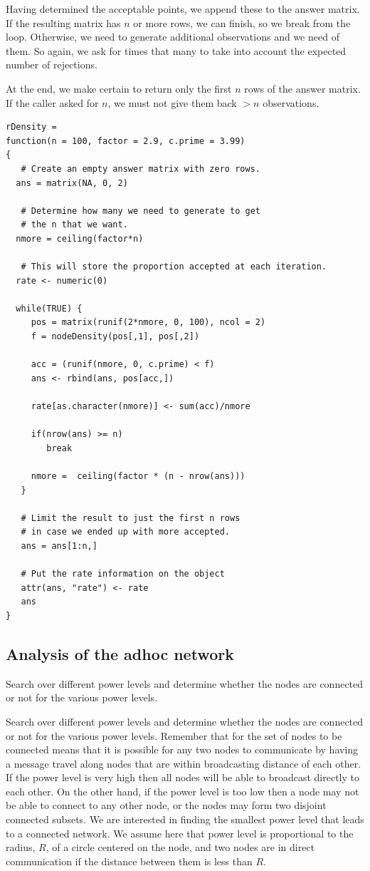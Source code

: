 Having determined the acceptable points, we append these to the answer
matrix. If the resulting matrix has $n$ or more rows, we can finish,
so we break from the loop.  Otherwise, we need to generate additional
observations and we need  of them.  So
again, we ask for  times that many to take into account
the expected number of rejections.

At the end, we make certain to return only the first $n$ rows of the
answer matrix. If the caller asked for $n$, we must not give them back
$> n$ observations.

{\footnotesize{
\begin{verbatim}
rDensity =
function(n = 100, factor = 2.9, c.prime = 3.99)
{
   # Create an empty answer matrix with zero rows.
  ans = matrix(NA, 0, 2)

   # Determine how many we need to generate to get
   # the n that we want. 
  nmore = ceiling(factor*n)

   # This will store the proportion accepted at each iteration.
  rate <- numeric(0)
  
  while(TRUE) {
     pos = matrix(runif(2*nmore, 0, 100), ncol = 2)
     f = nodeDensity(pos[,1], pos[,2])
     
     acc = (runif(nmore, 0, c.prime) < f)
     ans <- rbind(ans, pos[acc,])

     rate[as.character(nmore)] <- sum(acc)/nmore
     
     if(nrow(ans) >= n)
        break

     nmore =  ceiling(factor * (n - nrow(ans)))
   }

   # Limit the result to just the first n rows
   # in case we ended up with more accepted.
   ans = ans[1:n,]

   # Put the rate information on the object
   attr(ans, "rate") <- rate
   ans
}
\end{verbatim}
}}




\subsection{Analysis of the adhoc network}
Search over different power levels and determine whether the nodes are
connected or not for the various power levels.  

Search over different power levels and determine whether the nodes are
connected or not for the various power levels.
Remember that for the set of nodes to be connected means that
it is possible for any two nodes to communicate by having a message
travel along nodes that are within broadcasting distance of each other.
If the power level is very high then all nodes will be able to broadcast
directly to each other. On the other hand, if the power level is too low
then a node may not be able to connect to any other node, or the nodes may
form two disjoint connected subsets.
We are interested in finding the smallest power level that leads to a
connected network. We assume here that power level is proportional
to the radius, $R$, of a circle centered on the node, and two nodes are
in direct communication if the distance between them is less than $R$.


